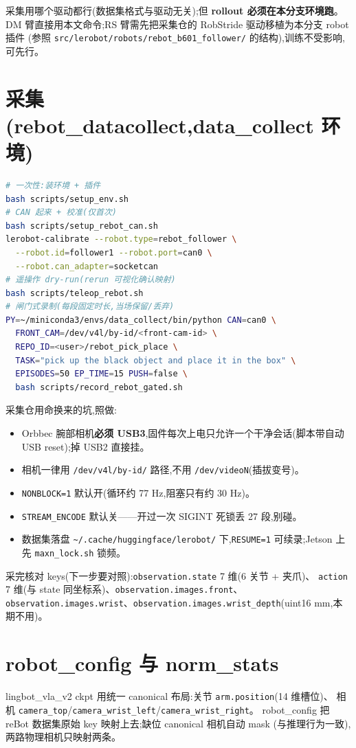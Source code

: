 \documentclass[11pt]{ctexart}
\begin{document}
采集用哪个驱动都行(数据集格式与驱动无关);但 \textbf{rollout 必须在本分支环境跑}。
DM 臂直接用本文命令;RS 臂需先把采集仓的 RobStride 驱动移植为本分支 robot 插件
(参照 \texttt{src/lerobot/robots/rebot\_b601\_follower/} 的结构),训练不受影响,可先行。

\section{采集(rebot\_datacollect,data\_collect 环境)}
\begin{lstlisting}[language=bash,caption={采集标准流程(详见采集仓 scripts/)}]
# 一次性:装环境 + 插件
bash scripts/setup_env.sh
# CAN 起来 + 校准(仅首次)
bash scripts/setup_rebot_can.sh
lerobot-calibrate --robot.type=rebot_follower \
  --robot.id=follower1 --robot.port=can0 \
  --robot.can_adapter=socketcan
# 遥操作 dry-run(rerun 可视化确认映射)
bash scripts/teleop_rebot.sh
# 闸门式录制(每段固定时长,当场保留/丢弃)
PY=~/miniconda3/envs/data_collect/bin/python CAN=can0 \
  FRONT_CAM=/dev/v4l/by-id/<front-cam-id> \
  REPO_ID=<user>/rebot_pick_place \
  TASK="pick up the black object and place it in the box" \
  EPISODES=50 EP_TIME=15 PUSH=false \
  bash scripts/record_rebot_gated.sh
\end{lstlisting}

采集仓用命换来的坑,照做:
\begin{itemize}
\item Orbbec 腕部相机\textbf{必须 USB3},固件每次上电只允许一个干净会话(脚本带自动 USB reset);掉 USB2 直接挂。
\item 相机一律用 \texttt{/dev/v4l/by-id/} 路径,不用 \texttt{/dev/videoN}(插拔变号)。
\item \texttt{NONBLOCK=1} 默认开(循环约 77 Hz,阻塞只有约 30 Hz)。
\item \texttt{STREAM\_ENCODE} 默认关——开过一次 SIGINT 死锁丢 27 段,别碰。
\item 数据集落盘 \texttt{\textasciitilde/.cache/huggingface/lerobot/} 下,\texttt{RESUME=1} 可续录;Jetson 上先 \texttt{maxn\_lock.sh} 锁频。
\end{itemize}

采完核对 keys(下一步要对照):\texttt{observation.state} 7 维(6 关节 + 夹爪)、
\texttt{action} 7 维(与 state 同坐标系)、\texttt{observation.images.front}、
\texttt{observation.images.wrist}、\texttt{observation.images.wrist\_depth}(uint16 mm,本期不用)。

\section{robot\_config 与 norm\_stats}
lingbot\_vla\_v2 ckpt 用统一 canonical 布局:关节 \texttt{arm.position}(14 维槽位)、
相机 \texttt{camera\_top}/\texttt{camera\_wrist\_left}/\texttt{camera\_wrist\_right}。
robot\_config 把 reBot 数据集原始 key 映射上去;缺位 canonical 相机自动 mask
(与推理行为一致),两路物理相机只映射两条。
\end{document}
